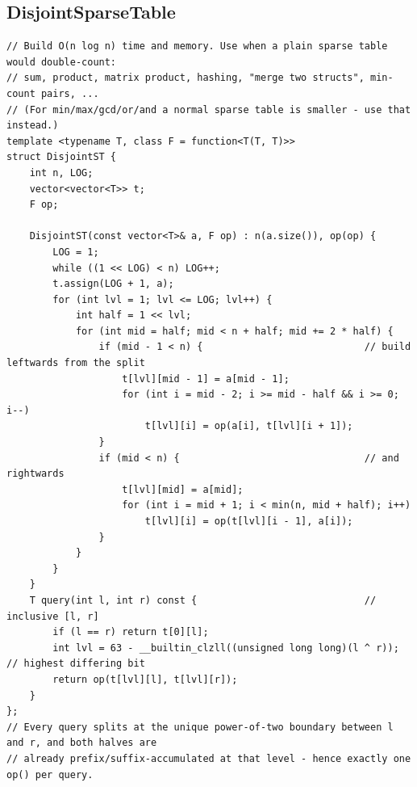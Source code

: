 \documentclass[9pt,a4paper,twocolumn]{extarticle}
\begin{document}
\subsection{DisjointSparseTable}
\nopagebreak
\begin{lstlisting}
// Build O(n log n) time and memory. Use when a plain sparse table would double-count:
// sum, product, matrix product, hashing, "merge two structs", min-count pairs, ...
// (For min/max/gcd/or/and a normal sparse table is smaller - use that instead.)
template <typename T, class F = function<T(T, T)>>
struct DisjointST {
    int n, LOG;
    vector<vector<T>> t;
    F op;

    DisjointST(const vector<T>& a, F op) : n(a.size()), op(op) {
        LOG = 1;
        while ((1 << LOG) < n) LOG++;
        t.assign(LOG + 1, a);
        for (int lvl = 1; lvl <= LOG; lvl++) {
            int half = 1 << lvl;
            for (int mid = half; mid < n + half; mid += 2 * half) {
                if (mid - 1 < n) {                            // build leftwards from the split
                    t[lvl][mid - 1] = a[mid - 1];
                    for (int i = mid - 2; i >= mid - half && i >= 0; i--)
                        t[lvl][i] = op(a[i], t[lvl][i + 1]);
                }
                if (mid < n) {                                // and rightwards
                    t[lvl][mid] = a[mid];
                    for (int i = mid + 1; i < min(n, mid + half); i++)
                        t[lvl][i] = op(t[lvl][i - 1], a[i]);
                }
            }
        }
    }
    T query(int l, int r) const {                             // inclusive [l, r]
        if (l == r) return t[0][l];
        int lvl = 63 - __builtin_clzll((unsigned long long)(l ^ r));   // highest differing bit
        return op(t[lvl][l], t[lvl][r]);
    }
};
// Every query splits at the unique power-of-two boundary between l and r, and both halves are
// already prefix/suffix-accumulated at that level - hence exactly one op() per query.
\end{lstlisting}

\filbreak
\end{document}
